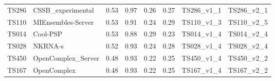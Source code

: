 \begin{table}[ht]
{\begin{tabular}{llllllll}
TS286 & CSSB\_experimental & 0.53 & 0.97 & 0.26 & 0.27 & TS286\_v1\_1 & TS286\_v2\_1 \\ 
TS110 & MIEnsembles-Server & 0.53 & 0.91 & 0.24 & 0.29 & TS110\_v1\_3 & TS110\_v2\_5 \\ 
TS014 & Cool-PSP & 0.53 & 0.88 & 0.29 & 0.23 & TS014\_v1\_4 & TS014\_v2\_4 \\ 
TS028 & NKRNA-s & 0.52 & 0.93 & 0.24 & 0.28 & TS028\_v1\_4 & TS028\_v2\_4 \\ 
TS450 & OpenComplex\_Server & 0.48 & 0.93 & 0.22 & 0.25 & TS450\_v1\_4 & TS450\_v2\_2 \\ 
TS167 & OpenComplex & 0.48 & 0.93 & 0.22 & 0.25 & TS167\_v1\_4 & TS167\_v2\_2 \\ 
\bottomrule
\end{tabular}%
}
\end{table}
